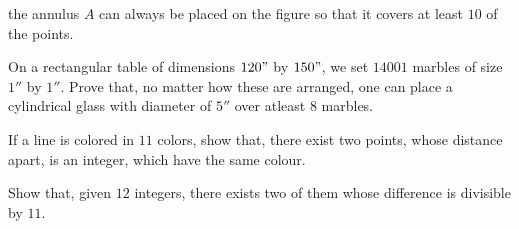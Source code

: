   the annulus $A$ can always be placed on the figure so that it covers at least $10$ of the points.
\item On a rectangular table of dimensions $120"$ by $150"$, we set $14001$ marbles of size $1″$ by
  $1″$. Prove that, no matter how these are arranged, one can place a cylindrical glass with diameter of
  $5″$ over atleast $8$ marbles.
\item If a line is colored in $11$ colors, show that, there exist two points, whose distance apart, is an
  integer, which have the same colour.
\item Show that, given $12$ integers, there exists two of them whose difference is divisible by $11$.
\stopitemize
